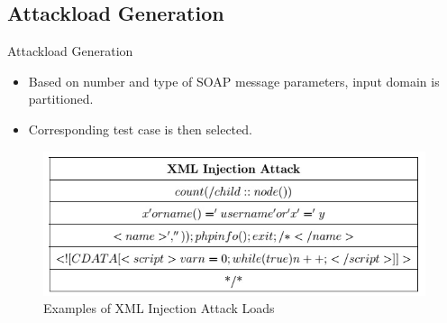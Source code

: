 \documentclass{bredelebeamer}
\begin{document}
\subsection{Attackload Generation}
\begin{frame}{Attackload Generation}
	
	\begin{itemize}
		\large
		\item Based on number and type of SOAP message parameters, input domain is partitioned.
		\newline
		\item Corresponding test case is then selected. 
		\newline
	\end{itemize}
	\begin{figure}
\centering
\includegraphics[width=0.7\linewidth]{images/WS/AttackLoad}
\caption{Examples of XML Injection Attack Loads}
\label{fig:AttackLoad}
\end{figure}
\end{frame}

%		
\end{document}
